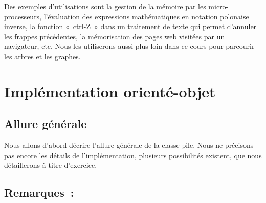	Des exemples d'utilisations sont la gestion de la mémoire 
	par les micro-processeurs, l'évaluation des expressions
	mathématiques en notation polonaise inverse, la fonction 
	«~ctrl-Z~» dans un traitement de texte qui permet d'annuler
	les frappes précédentes, la mémorisation des pages web visitées 
	par un navigateur, etc. Nous les utiliserons aussi plus
	loin dans ce cours pour parcourir les arbres et les graphes.


\section{Implémentation orienté-objet}

	\subsection{Allure générale}
		
		Nous allons d'abord décrire l'allure générale de la 
		classe pile. Nous ne précisons pas encore les détails de
		l'implémentation, plusieurs possibilités existent, 
		que nous détaillerons à titre d'exercice.

		
	\subsection{Remarques~:}
		

